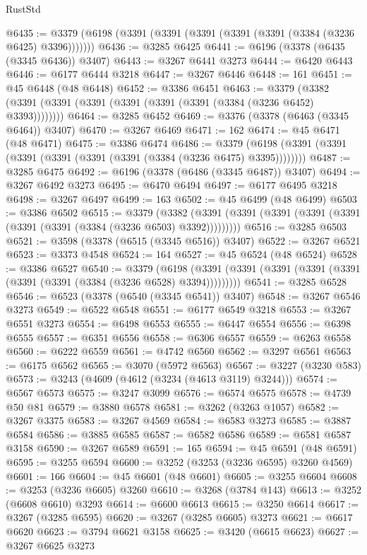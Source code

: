 \begin{lexlean}{RustStd}
\begin{coremodule}
{\begin{coremodule}
{{{{{{{{{{{{{{{{{{{{{{{{{{{{{{{{{{{{{{{@6435 := @3379 (@6198 (@3391 (@3391 (@3391 (@3391 (@3391 (@3384 (@3236 @6425) @3396)))))))
@6436 := @3285 @6425
@6441 := @6196 (@3378 (@6435 (@3345 @6436)) @3407)
@6443 := @3267 @6441 @3273
@6444 := @6420 @6443
@6446 := @6177 @6444 @3218
@6447 := @3267 @6446
@6448 := 161
@6451 := @45 @6448 (@48 @6448)
@6452 := @3386 @6451
@6463 := @3379 (@3382 (@3391 (@3391 (@3391 (@3391 (@3391 (@3391 (@3384 (@3236 @6452) @3393))))))))
@6464 := @3285 @6452
@6469 := @3376 (@3378 (@6463 (@3345 @6464)) @3407)
@6470 := @3267 @6469
@6471 := 162
@6474 := @45 @6471 (@48 @6471)
@6475 := @3386 @6474
@6486 := @3379 (@6198 (@3391 (@3391 (@3391 (@3391 (@3391 (@3391 (@3384 (@3236 @6475) @3395))))))))
@6487 := @3285 @6475
@6492 := @6196 (@3378 (@6486 (@3345 @6487)) @3407)
@6494 := @3267 @6492 @3273
@6495 := @6470 @6494
@6497 := @6177 @6495 @3218
@6498 := @3267 @6497
@6499 := 163
@6502 := @45 @6499 (@48 @6499)
@6503 := @3386 @6502
@6515 := @3379
    (@3382 (@3391 (@3391 (@3391 (@3391 (@3391 (@3391 (@3391 (@3384 (@3236 @6503) @3392)))))))))
@6516 := @3285 @6503
@6521 := @3598 (@3378 (@6515 (@3345 @6516)) @3407)
@6522 := @3267 @6521
@6523 := @3373 @4548
@6524 := 164
@6527 := @45 @6524 (@48 @6524)
@6528 := @3386 @6527
@6540 := @3379
    (@6198 (@3391 (@3391 (@3391 (@3391 (@3391 (@3391 (@3391 (@3384 (@3236 @6528) @3394)))))))))
@6541 := @3285 @6528
@6546 := @6523 (@3378 (@6540 (@3345 @6541)) @3407)
@6548 := @3267 @6546 @3273
@6549 := @6522 @6548
@6551 := @6177 @6549 @3218
@6553 := @3267 @6551 @3273
@6554 := @6498 @6553
@6555 := @6447 @6554
@6556 := @6398 @6555
@6557 := @6351 @6556
@6558 := @6306 @6557
@6559 := @6263 @6558
@6560 := @6222 @6559
@6561 := @4742 @6560
@6562 := @3297 @6561
@6563 := @6175 @6562
@6565 := @3070 (@5972 @6563)
@6567 := @3227 (@3230 @583)
@6573 := @3243 (@4609 (@4612 (@3234 (@4613 @3119) @3244)))
@6574 := @6567 @6573
@6575 := @3247 @3099
@6576 := @6574 @6575
@6578 := @4739 @50 @81
@6579 := @3880 @6578
@6581 := @3262 (@3263 @1057)
@6582 := @3267 @3375
@6583 := @3267 @4569
@6584 := @6583 @3273
@6585 := @3887 @6584
@6586 := @3885 @6585
@6587 := @6582 @6586
@6589 := @6581 @6587 @3158
@6590 := @3267 @6589
@6591 := 165
@6594 := @45 @6591 (@48 @6591)
@6595 := @3255 @6594
@6600 := @3252 (@3253 (@3236 @6595) @3260 @4569)
@6601 := 166
@6604 := @45 @6601 (@48 @6601)
@6605 := @3255 @6604
@6608 := @3253 (@3236 @6605) @3260
@6610 := @3268 (@3784 @143)
@6613 := @3252 (@6608 @6610) @3293
@6614 := @6600 @6613
@6615 := @3250 @6614
@6617 := @3267 (@3285 @6595)
@6620 := @3267 (@3285 @6605) @3273
@6621 := @6617 @6620
@6623 := @3794 @6621 @3158
@6625 := @3420 (@6615 @6623)
@6627 := @3267 @6625 @3273
}}}}}}}}}}}}}}}}}}}}}}}}}}}}}}}}}}}}}}}
\end{coremodule}}
\end{coremodule}
\end{lexlean}
